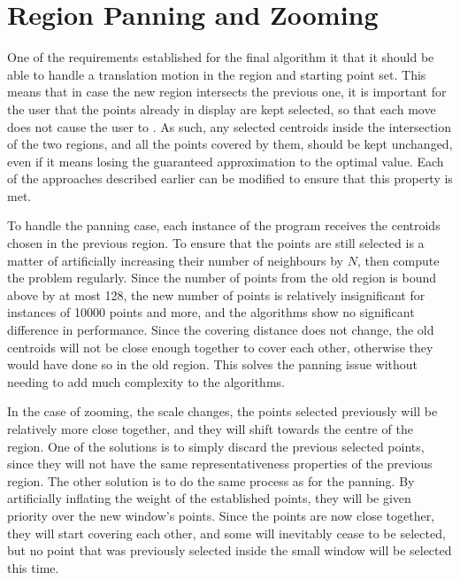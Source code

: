 \section{Region Panning and Zooming}
\begin{change}
One of the requirements established for the final algorithm it that it should be able to handle a translation motion in the region and starting point set. This means that in case the new region intersects the previous one, it is important for the user that the points already in display are kept selected, so that each move does not cause the user to . As such, any selected centroids inside the intersection of the two regions, and all the points covered by them, should be kept unchanged, even if it means losing the guaranteed approximation to the optimal value. Each of the approaches described earlier can be modified to ensure that this property is met. 

To handle the panning case, each instance of the program receives the centroids chosen in the previous region. To ensure that the points are still selected is a matter of artificially increasing their number of neighbours by $N$, then compute the problem regularly.  Since the number of points from the old region is bound above by at most 128, the new number of points is relatively insignificant for instances of 10000 points and more, and the algorithms show no significant difference in performance. Since the covering distance does not change, the old centroids will not be close enough together to cover each other, otherwise they would have done so in the old region. This solves the panning issue without needing to add much complexity to the algorithms.

In the case of zooming, the scale changes, the points selected previously will be relatively more close together, and they will shift towards the centre of the region. One of the solutions is to simply discard the previous selected points, since they will not have the same representativeness properties of the previous region. The other solution is to do the same process as for the panning. By artificially inflating the weight of the established points, they will be given priority over the new window's points. Since the points are now close together, they will start covering each other, and some will inevitably cease to be selected, but no point that was previously selected inside the small window will be selected this time.
\end{change}